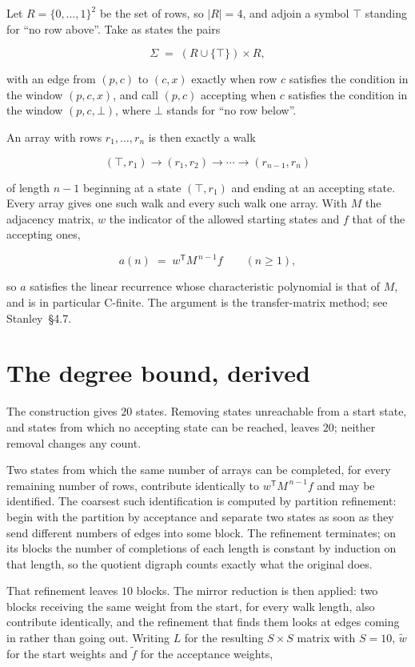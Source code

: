 \documentclass[11pt]{article}
\theoremstyle{definition}
\begin{document}
Let $R = \{0,\dots,1\}^{2}$ be the set of rows, so $|R| = 4$, and adjoin a symbol $\top$ standing for ``no row above''. Take as states the pairs

\[\Sigma \;=\; (R \cup \{\top\}) \times R,\]

with an edge from $(p,c)$ to $(c,x)$ exactly when row $c$ satisfies the condition in the window $(p,c,x)$, and call $(p,c)$ accepting when $c$ satisfies the condition in the window $(p,c,\bot)$, where $\bot$ stands for ``no row below''.

An array with rows $r_1,\dots,r_n$ is then exactly a walk

\[(\top,r_1) \to (r_1,r_2) \to \cdots \to (r_{n-1},r_n)\]

of length $n-1$ beginning at a state $(\top,r_1)$ and ending at an accepting state. Every array gives one such walk and every such walk one array. With $M$ the adjacency matrix, $w$ the indicator of the allowed starting states and $f$ that of the accepting ones,

\[a(n) \;=\; w^{\mathsf T} M^{\,n-1} f \qquad (n \ge 1),\]

so $a$ satisfies the linear recurrence whose characteristic polynomial is that of $M$, and is in particular C-finite. The argument is the transfer-matrix method; see Stanley~\S4.7.

\section{The degree bound, derived}

The construction gives $20$ states. Removing states unreachable from a start state, and states from which no accepting state can be reached, leaves $20$; neither removal changes any count.

Two states from which the same number of arrays can be completed, for every remaining number of rows, contribute identically to $w^{\mathsf T}M^{\,n-1}f$ and may be identified. The coarsest such identification is computed by partition refinement: begin with the partition by acceptance and separate two states as soon as they send different numbers of edges into some block. The refinement terminates; on its blocks the number of completions of each length is constant by induction on that length, so the quotient digraph counts exactly what the original does.

That refinement leaves $10$ blocks. The mirror reduction is then applied: two blocks receiving the same weight from the start, for every walk length, also contribute identically, and the refinement that finds them looks at edges coming in rather than going out. Writing $L$ for the resulting $S \times S$ matrix with $S = 10$, $\tilde w$ for the start weights and $\tilde f$ for the acceptance weights,
\end{document}
